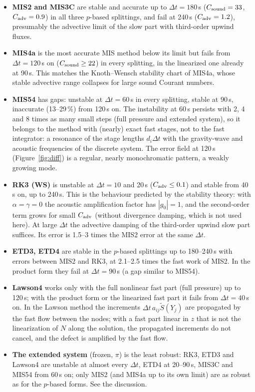 \documentclass[11pt,a4paper]{article}
\newcommand{\dt}{\Delta t}
\begin{document}
\begin{itemize}
\item \textbf{MIS2 and MIS3C} are stable and accurate up to $\dt=180$\,s ($C_{\rm sound}=33$,
$C_{\rm adv}=0.9$) in all three $p$-based splittings, and fail at 240\,s ($C_{\rm adv}=1.2$), presumably
the advective limit of the slow part with third-order upwind fluxes.
\item \textbf{MIS4a} is the most accurate MIS method below its limit but fails from $\dt=120$\,s on
($C_{\rm sound}\ge22$) in every splitting, in the linearized one already at 90\,s. This matches the Knoth--Wensch stability chart of MIS4a,
whose stable advective range collapses for large sound Courant numbers.
\item \textbf{MIS54} has gaps: unstable at $\dt=60$\,s in every splitting, stable at 90\,s, inaccurate
(13--29\,\%) from 120\,s on. The instability at 60\,s persists with 2, 4 and 8 times as many small steps
(full pressure and extended system), so it belongs to the method with (nearly) exact fast stages,
not to the fast integrator: a
resonance of the stage lengths $d_i\dt$ with the gravity-wave and acoustic frequencies of the
discrete system. The error field at 120\,s (Figure~\ref{fig:diff}) is a regular, nearly
monochromatic pattern, a weakly growing mode.
\item \textbf{RK3 (WS)} is unstable at $\dt=10$ and 20\,s ($C_{\rm adv}\le0.1$) and stable from 40\,s
on, up to 240\,s. This is the behaviour predicted by the stability theory: with $\alpha=\gamma=0$ the
acoustic amplification factor has $|g_0|=1$, and the second-order term grows for small $C_{\rm adv}$
(without divergence damping, which is not used here). At large $\dt$ the advective damping of
the third-order upwind slow part suffices. Its error is 1.5--3 times the MIS2 error at the same
$\dt$.
\item \textbf{ETD3, ETD4} are stable in the $p$-based splittings up to 180--240\,s with errors between
MIS2 and RK3, at 2.1--2.5 times the fast work of MIS2. In the product form they fail at
$\dt=90$\,s (a gap similar to MIS54).
\item \textbf{Lawson4} works only with the full nonlinear fast part (full pressure) up to 120\,s; with
the product form or the linearized fast part it fails from $\dt=40$\,s on. In the Lawson
method the increments $\dt\,a_{ij}\tilde S(Y_j)$ are propagated by the fast flow between the nodes;
with a fast part linear in $z$ that is not the linearization of $N$ along the solution, the
propagated increments do not cancel, and the defect is amplified by the fast flow.
\item \textbf{The extended system} (frozen, $\pi$) is the least robust: RK3, ETD3 and Lawson4 are unstable
at almost every $\dt$, ETD4 at 20--90\,s, MIS3C and MIS54 from 60\,s on; only MIS2 (and MIS4a up to its
own limit) are as robust as for the $p$-based forms. See the discussion.
\end{itemize}
\end{document}
